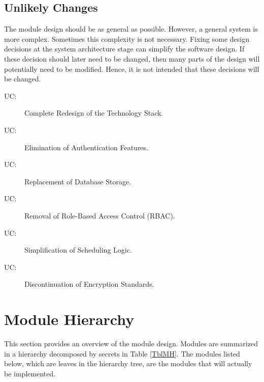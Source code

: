 \documentclass[12pt, titlepage]{article}
\newcounter{ucnum}
\newcommand{\uctheucnum}{UC\theucnum}
\begin{document}

\subsection{Unlikely Changes} \label{SecUchange}

The module design should be as general as possible. However, a general system is
more complex. Sometimes this complexity is not necessary. Fixing some design
decisions at the system architecture stage can simplify the software design. If
these decision should later need to be changed, then many parts of the design
will potentially need to be modified. Hence, it is not intended that these
decisions will be changed.

\begin{description}
\item[ \uctheucnum \label{ucTechStack}:] Complete Redesign of the Technology Stack.
\item[ \uctheucnum \label{ucAuthFeatures}:] Elimination of Authentication Features.
\item[ \uctheucnum \label{ucDataStores}:] Replacement of Database Storage.
\item[ \uctheucnum \label{ucRBAC}:] Removal of Role-Based Access Control (RBAC).
\item[ \uctheucnum \label{ucSchedLogic}:] Simplification of Scheduling Logic.
\item[ \uctheucnum \label{ucEncryptStandard}:] Discontinuation of Encryption Standards.
\end{description}

\section{Module Hierarchy} \label{SecMH}

This section provides an overview of the module design. Modules are summarized
in a hierarchy decomposed by secrets in Table \ref{TblMH}. The modules listed
below, which are leaves in the hierarchy tree, are the modules that will
actually be implemented.
\end{document}
